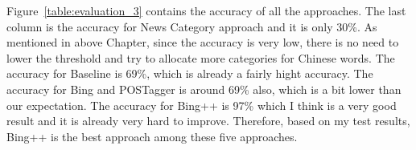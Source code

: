 \begin{CJK}{UTF8}{gbsn}
Figure~\ref{table:evaluation_3} contains the accuracy of all the approaches. The last column is the accuracy for News Category approach and it is only 30\%. As mentioned in above Chapter, since the accuracy is very low, there is no need to lower the threshold and try to allocate more categories for Chinese words. The accuracy for Baseline is 69\%, which is already a fairly hight accuracy. The accuracy for Bing and POSTagger is around 69\% also, which is a bit lower than our expectation. The accuracy for Bing++ is 97\% which I think is a very good result and it is already very hard to improve. Therefore, based on my test results, Bing++ is the best approach among these five approaches.

\end{CJK}